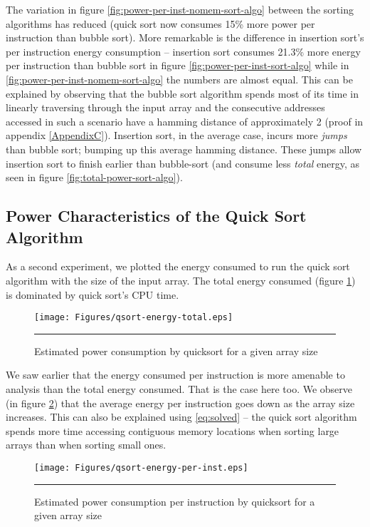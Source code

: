 The variation in figure \ref{fig:power-per-inst-nomem-sort-algo}
between the sorting algorithms has reduced (quick sort now consumes
15\% more power per instruction than bubble sort).  More remarkable is
the difference in insertion sort's per instruction energy consumption
-- insertion sort consumes 21.3\% more energy per instruction than
bubble sort in figure \ref{fig:power-per-inst-sort-algo} while in
\ref{fig:power-per-inst-nomem-sort-algo} the numbers are almost equal.
This can be explained by observing that the bubble sort algorithm
spends most of its time in linearly traversing through the input array
and the consecutive addresses accessed in such a scenario have a
hamming distance of approximately 2 (proof in appendix
\ref{AppendixC}).  Insertion sort, in the average case, incurs more
\textit{jumps} than bubble sort; bumping up this average hamming
distance.  These jumps allow insertion sort to finish earlier than
bubble-sort (and consume less \textit{total} energy, as seen in figure
\ref{fig:total-power-sort-algo}).

\subsection{Power Characteristics of the Quick Sort Algorithm}

As a second experiment, we plotted the energy consumed to run the
quick sort algorithm with the size of the input array.  The total
energy consumed (figure \ref{fig:qsort-energy-per-array-length}) is
dominated by quick sort's CPU time.

\begin{figure}[htbp]
  \centering
  \texttt{[image: Figures/qsort-energy-total.eps]}
  \rule{35em}{0.5pt}
  \caption{Estimated power consumption by quicksort for a given array size}
  \label{fig:qsort-energy-per-array-length}
\end{figure}

We saw earlier that the energy consumed per instruction is more
amenable to analysis than the total energy consumed.  That is the case
here too.  We observe (in figure
\ref{fig:qsort-energy-per-inst-per-array-length}) that the average
energy per instruction goes down as the array size increases.  This
can also be explained using \ref{eq:solved} -- the quick sort
algorithm spends more time accessing contiguous memory locations when
sorting large arrays than when sorting small ones.

\begin{figure}[htbp]
  \centering
  \texttt{[image: Figures/qsort-energy-per-inst.eps]}
  \rule{35em}{0.5pt}
  \caption{Estimated power consumption per instruction by quicksort
    for a given array size}
  \label{fig:qsort-energy-per-inst-per-array-length}
\end{figure}

